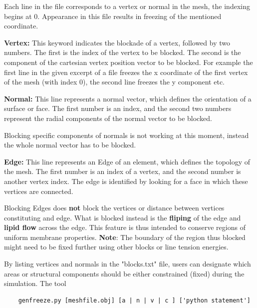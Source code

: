 \documentclass[11pt]{article}
\begin{document}
\noindent
Each line in the file corresponds to a vertex or normal in the mesh, the indexing begins at 0. Appearance in this file results in freezing of the mentioned coordinate. 

\noindent
\textbf{Vertex:} This keyword indicates the blockade of a vertex, followed by two numbers. The first is the index of the vertex to be blocked. The second is the component of the cartesian vertex position vector to be blocked. For example the first line in the given excerpt of a file freezes the x coordinate of the first vertex of the mesh (with index 0), the second line freezes the y component etc.


\noindent
\textbf{Normal:} This line represents a normal vector, which defines the orientation of a surface or face. The first number is an index, and the second two numbers represent the radial components of the normal vector to be blocked. 

\begin{tcolorbox}[colback=orange!5!white,colframe=orange!75!black,title=Clarification]
Blocking specific components of normals is not working at this moment, instead the whole normal vector has to be blocked.
\end{tcolorbox}

\noindent
\textbf{Edge:} This line represents an Edge of an element, which defines the topology of the mesh. The first number is an index of a vertex, and the second number is another vertex index. The edge is identified by looking for a face in which these vertices are connected.
\noindent

\begin{tcolorbox}[colback=orange!5!white,colframe=orange!75!black,title=Clarification]
Blocking Edges does \textbf{not} block the vertices or distance between vertices constituting and edge. What is blocked instead is the \textbf{fliping} of the edge and \textbf{lipid flow} across the edge. This feature is thus intended to conserve regions of uniform membrane properties. \textbf{Note}: The boundary of the region thus blocked might need to be fixed further using other blocks or line tension energies.
\end{tcolorbox}


By listing vertices and normals in the "blocks.txt" file, users can designate which areas or structural components should be either constrained (fixed) during the simulation. The tool 
\begin{verbatim}
    genfreeze.py [meshfile.obj] [a | n | v | c ] ['python statement'] 
\end{verbatim}%
\end{document}
